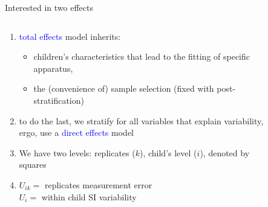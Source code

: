 \begin{frame}
	{Interested in two effects}
	\begin{columns}
		\begin{column}{0.5\textwidth}
			\begin{enumerate}
				\item \textcolor{blue}{total effects} model inherits:
				\begin{itemize}
					\item children’s characteristics that lead to the fitting of specific apparatus,
					\item the (convenience of) sample selection \alert{(fixed with post-stratification)}
				\end{itemize}
				\item to do the last, we stratify for all variables that explain variability, ergo, use a \textcolor{blue}{direct effects} model
				\item We have two levels: replicates ($k$), child's level ($i$), denoted by squares
				\item $U_{ik}=$ replicates measurement error \\
				$U_{i}=$ within child SI variability \\
			\end{enumerate}
		\end{column}
		\begin{column}{0.5\textwidth}  
			\begin{figure}
\end{figure}
\end{column}
\end{columns}
\end{frame}
